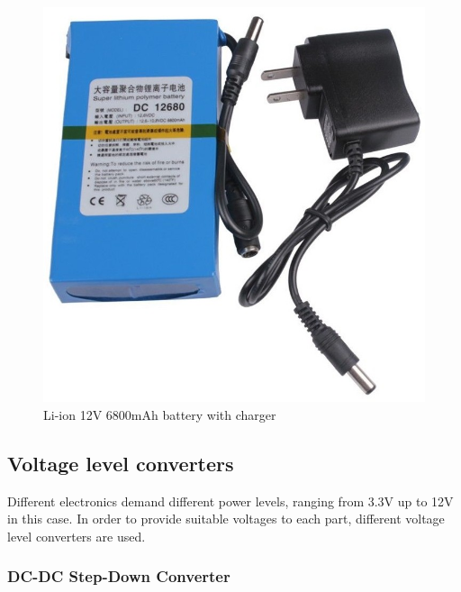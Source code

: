 		\begin{figure}[H]
				\centering
				\includegraphics[scale=0.25]{images/ProjectComponents/battery.jpg}
				\caption{Li-ion 12V 6800mAh battery with charger}
				\label{battery}
		\end{figure}
		\bigskip

	











\subsection{Voltage level converters}	

Different electronics demand different power levels, ranging from 3.3V up to 12V in this case. In order to provide suitable voltages to each part, different voltage level converters are used.

	\subsubsection{DC-DC Step-Down Converter}

